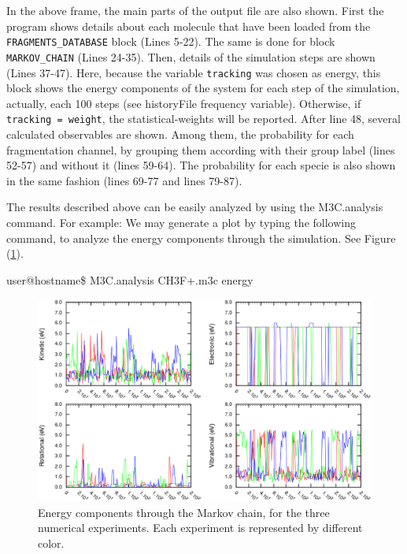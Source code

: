 \documentclass[a4paper,12pt]{article}
\begin{document}
In the above frame, the main parts of the output file are also shown. First the program shows details about each molecule that have been loaded 
from the \texttt{FRAGMENTS\_DATABASE} block (Lines 5-22). The same is done for block \texttt{MARKOV\_CHAIN} (Lines 24-35). Then, details of the 
simulation steps are shown (Lines 37-47). Here, because the variable \texttt{tracking} was chosen as energy, this block shows the energy components of the system 
for each step of the simulation, actually, each 100 steps (see historyFile frequency variable). Otherwise, if \texttt{tracking = weight}, the 
statistical-weights will be reported. After line 48, several calculated observables are shown. Among them, the probability for each fragmentation 
channel, by grouping them according with their group label (lines 52-57) and without it (lines 59-64). The probability for each specie is also 
shown in the same fashion (lines 69-77 and lines 79-87).

The results described above can be easily analyzed by using the M3C.analysis command. For example: We may generate a plot by 
typing the following command, to analyze the energy components through the simulation. See Figure (\ref{fig: history energy}).
	
\begin{shellexec}
user@hostname\$ M3C.analysis CH3F+.m3c energy
\end{shellexec}

\begin{figure}[h]
\centering
\includegraphics[scale=0.40]{images/historyEnergy.eps}
\caption{\footnotesize{
Energy components through the Markov chain, for the three numerical experiments. Each experiment is represented by different color.
}}
\label{fig: history energy}
\end{figure}
\end{document}
